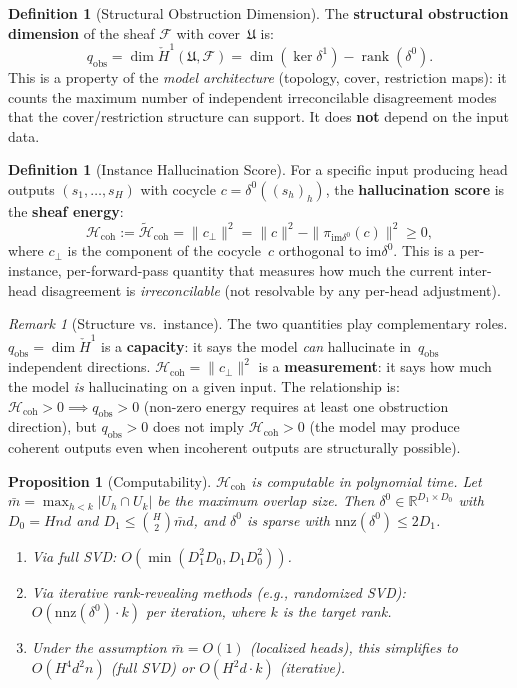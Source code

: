 \documentclass[11pt,a4paper]{article}
\theoremstyle{plain}
\newtheorem{proposition}[theorem]{Proposition}
\theoremstyle{definition}
\newtheorem{definition}[theorem]{Definition}
\theoremstyle{remark}
\newtheorem{remark}[theorem]{Remark}
\newcommand{\R}{\mathbb{R}}
\newcommand{\cF}{\mathcal{F}}
\newcommand{\cH}{\mathcal{H}}
\newcommand{\fU}{\mathfrak{U}}
\newcommand{\im}{\mathrm{im}}
\newcommand{\Hcoh}{\mathcal{H}_{\mathrm{coh}}}
\newcommand{\CechH}{\check{H}}
\DeclareMathOperator{\rank}{rank}
\begin{document}
\begin{definition}[Structural Obstruction Dimension]\label{def:hcoh}
The \textbf{structural obstruction dimension} of the sheaf $\cF$ with cover~$\fU$ is:
\[
q_{\mathrm{obs}} = \dim\CechH^1(\fU, \cF) = \dim(\ker\delta^1) - \rank(\delta^0).
\]
This is a property of the \emph{model architecture} (topology, cover, restriction maps): it counts the maximum number of independent irreconcilable disagreement modes that the cover/restriction structure can support. It does \textbf{not} depend on the input data.
\end{definition}

\begin{definition}[Instance Hallucination Score]\label{def:hall-score}
For a specific input producing head outputs $(s_1, \ldots, s_H)$ with cocycle $c = \delta^0((s_h)_h)$, the \textbf{hallucination score} is the \textbf{sheaf energy}:
\[
\Hcoh := \widetilde{\cH}_{\mathrm{coh}} = \|c_\perp\|^2 = \|c\|^2 - \|\pi_{\im\delta^0}(c)\|^2 \geq 0,
\]
where $c_\perp$ is the component of the cocycle~$c$ orthogonal to $\im\delta^0$. This is a per-instance, per-forward-pass quantity that measures how much the current inter-head disagreement is \emph{irreconcilable} (not resolvable by any per-head adjustment).
\end{definition}

\begin{remark}[Structure vs.\ instance]\label{rem:structure-instance}
The two quantities play complementary roles. $q_{\mathrm{obs}} = \dim\CechH^1$ is a \textbf{capacity}: it says the model \emph{can} hallucinate in~$q_{\mathrm{obs}}$ independent directions. $\Hcoh = \|c_\perp\|^2$ is a \textbf{measurement}: it says how much the model \emph{is} hallucinating on a given input. The relationship is: $\Hcoh > 0 \implies q_{\mathrm{obs}} > 0$ (non-zero energy requires at least one obstruction direction), but $q_{\mathrm{obs}} > 0$ does not imply $\Hcoh > 0$ (the model may produce coherent outputs even when incoherent outputs are structurally possible).
\end{remark}

\begin{proposition}[Computability]\label{prop:compute}
$\Hcoh$ is computable in polynomial time. Let $\bar{m} = \max_{h < k}|U_h \cap U_k|$ be the maximum overlap size. Then $\delta^0 \in \R^{D_1 \times D_0}$ with $D_0 = Hnd$ and $D_1 \leq \binom{H}{2}\bar{m}d$, and $\delta^0$ is sparse with $\mathrm{nnz}(\delta^0) \leq 2D_1$.
\begin{enumerate}[label=(\roman*),nosep]
\item Via full SVD: $O(\min(D_1^2 D_0, D_1 D_0^2))$.
\item Via iterative rank-revealing methods (e.g., randomized SVD): $O(\mathrm{nnz}(\delta^0) \cdot k)$ per iteration, where $k$ is the target rank.
\item Under the assumption $\bar{m} = O(1)$ (localized heads), this simplifies to $O(H^4 d^2 n)$ (full SVD) or $O(H^2 d \cdot k)$ (iterative).
\end{enumerate}
\end{proposition}
\end{document}

